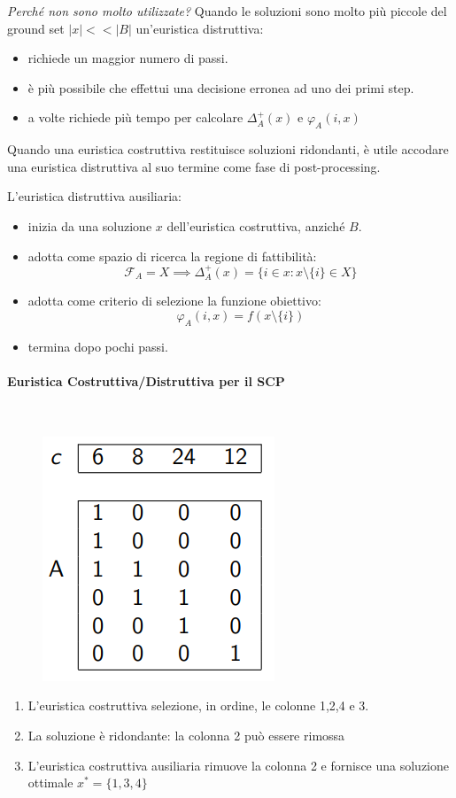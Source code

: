 \documentclass{article}
\begin{document}
    \textit{Perché non sono molto utilizzate?} Quando le soluzioni sono molto più piccole del ground set
$|x|<<|B|$ un'euristica distruttiva:
    \begin{itemize}
        \item richiede un maggior numero di passi.
        \item è più possibile che effettui una decisione erronea ad uno dei primi step.
        \item a volte richiede più tempo per calcolare $\Delta_A^+(x)$ e $\varphi_A(i,x)$
    \end{itemize}
    Quando una euristica costruttiva restituisce soluzioni ridondanti, è utile accodare una euristica
    distruttiva al suo termine come fase di post-processing.

    L'euristica distruttiva ausiliaria:
    \begin{itemize}
        \item inizia da una soluzione $x$ dell'euristica costruttiva, anziché $B$.
        \item adotta come spazio di ricerca la regione di fattibilità:
              $$\mathcal{F}_A=X\implies\Delta_A^+{(x)}=\{i\in x:x\setminus\{i\}\in X\}$$
        \item adotta come criterio di selezione la funzione obiettivo:
              $$\varphi_A(i,x)=f(x\setminus\{i\})$$
        \item termina dopo pochi passi.
    \end{itemize}

    \paragraph{Euristica Costruttiva/Distruttiva per il SCP}\mbox{}\\
    \begin{figure}[H]
        \centering
        \includegraphics[scale=0.7]{images/scp_cd.png}
    \end{figure}
    \begin{enumerate}
        \item L'euristica costruttiva selezione, in ordine, le colonne 1,2,4 e 3.
        \item La soluzione è ridondante: la colonna 2 può essere rimossa
        \item L'euristica costruttiva ausiliaria rimuove la colonna 2 e fornisce una soluzione ottimale $x^*=\{1,3,4\}$
    \end{enumerate}
\end{document}
